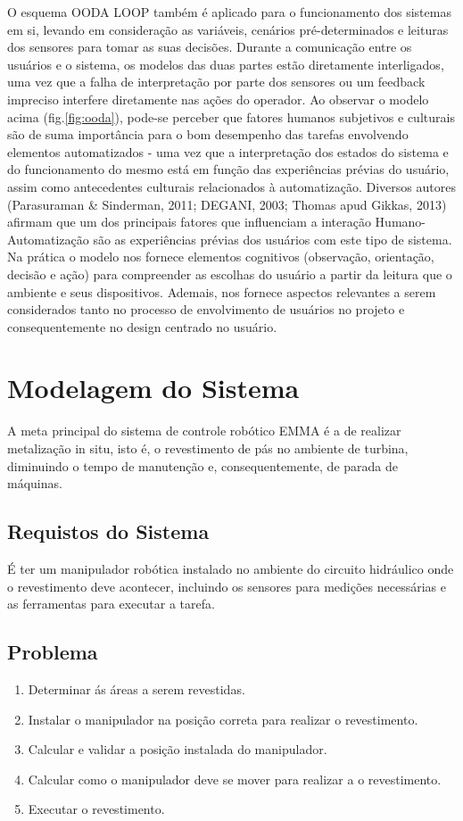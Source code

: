 \documentclass[12pt,a4paper]{article}
\begin{document}
O esquema OODA LOOP também é aplicado para o funcionamento dos sistemas em si, levando em consideração as variáveis, cenários pré-determinados e 
leituras dos sensores para tomar as suas decisões. Durante a comunicação entre os usuários e o sistema, os modelos das duas partes estão diretamente 
interligados, uma vez que a falha de interpretação por parte dos sensores ou um feedback impreciso interfere diretamente nas ações do operador.
Ao observar o modelo acima (fig.\ref{fig:ooda}), pode-se perceber que fatores humanos subjetivos e culturais são de suma importância para o bom desempenho 
das tarefas envolvendo elementos automatizados - uma vez que a interpretação dos estados do sistema e do funcionamento do mesmo está em função das 
experiências prévias do usuário, assim como antecedentes culturais relacionados à automatização. Diversos autores 
(Parasuraman \& Sinderman, 2011; DEGANI, 2003; Thomas apud Gikkas, 2013) afirmam
que um dos principais fatores que influenciam a interação Humano-Automatização são as experiências prévias dos usuários com este tipo de sistema. Na prática o modelo nos fornece elementos cognitivos 
(observação, orientação, decisão e ação) para compreender as escolhas do usuário a partir da leitura que o ambiente e seus dispositivos. Ademais, 
nos fornece aspectos relevantes a serem considerados tanto no processo de envolvimento de usuários no projeto e consequentemente no design centrado 
no usuário.


\section{Modelagem do Sistema}

A meta principal do sistema de controle robótico EMMA é a de realizar metalização in situ, isto é, o revestimento de pás no ambiente de turbina, 
diminuindo o tempo de manutenção e, consequentemente, de parada de máquinas.


\subsection{Requistos do Sistema}
É ter um manipulador robótica instalado no ambiente do circuito hidráulico onde o revestimento deve acontecer, incluindo os sensores para medições 
necessárias e as ferramentas para executar a tarefa.

\subsection{Problema}
\begin {enumerate}
  \item Determinar ás áreas a serem revestidas.
  \item Instalar o manipulador na posição correta para realizar o revestimento.
  \item Calcular e validar a posição instalada do manipulador.
  \item Calcular como o manipulador deve se mover para realizar a o
  revestimento.
  \item Executar o revestimento.
\end{enumerate}
\end{document}
